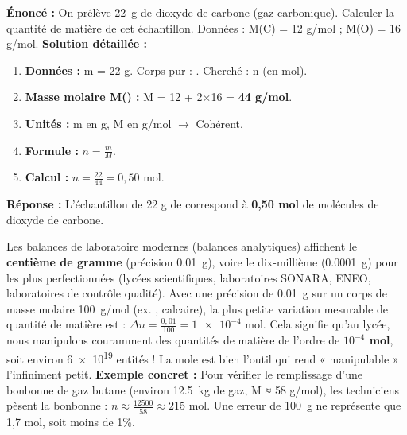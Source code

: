 \documentclass[11pt]{article}
\begin{document}
\begin{exoresolu}
\textbf{Énoncé :} On prélève \SI{22}{g} de dioxyde de carbone  (gaz carbonique). Calculer la quantité de matière de cet échantillon. Données : M(C) = 12 g/mol ; M(O) = 16 g/mol.
\tcblower
\textbf{Solution détaillée :}
\begin{enumerate}
\item \textbf{Données :} m = 22 g. Corps pur : . Cherché : n (en mol).
\item \textbf{Masse molaire M() :} M = 12 + 2×16 = \textbf{44 g/mol}.
\item \textbf{Unités :} m en g, M en g/mol $\rightarrow$ Cohérent.
\item \textbf{Formule :} $n = \frac{m}{M}$.
\item \textbf{Calcul :} $n = \frac{22}{44} = 0,50$ mol.
\end{enumerate}
\textbf{Réponse :} L'échantillon de 22 g de  correspond à \textbf{0,50 mol} de molécules de dioxyde de carbone.
\end{exoresolu}

\begin{savaistu}
Les balances de laboratoire modernes (balances analytiques) affichent le \textbf{centième de gramme} (précision \SI{0,01}{g}), voire le dix-millième (\SI{0,0001}{g}) pour les plus perfectionnées (lycées scientifiques, laboratoires SONARA, ENEO, laboratoires de contrôle qualité).
Avec une précision de \SI{0,01}{g} sur un corps de masse molaire \SI{100}{g/mol} (ex. , calcaire), la plus petite variation mesurable de quantité de matière est :
$\Delta n = \frac{0,01}{100} = \num{1e-4}$ mol.
Cela signifie qu'au lycée, nous manipulons couramment des quantités de matière de l'ordre de \textbf{$10^{-4}$ mol}, soit environ \num{6e19} entités ! La mole est bien l'outil qui rend « manipulable » l'infiniment petit.
\textbf{Exemple concret :} Pour vérifier le remplissage d'une bonbonne de gaz butane (environ \SI{12,5}{kg} de gaz, M ≈ 58 g/mol), les techniciens pèsent la bonbonne : $n \approx \frac{12500}{58} \approx 215$ mol. Une erreur de \SI{100}{g} ne représente que 1,7 mol, soit moins de 1\%.
\end{savaistu}
\end{document}
